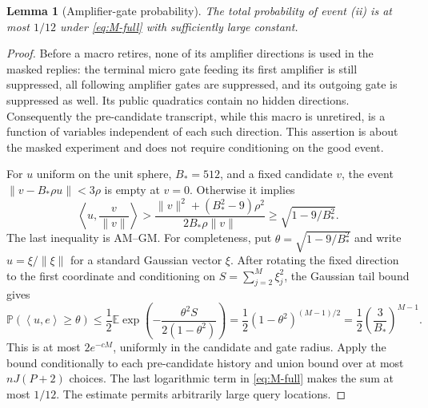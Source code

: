 \documentclass[11pt]{article}
\newtheorem{lemma}[theorem]{Lemma}
\theoremstyle{definition}
\theoremstyle{remark}
\newcommand{\E}{\mathbb E}
\newcommand{\PP}{\mathbb P}
\newcommand{\norm}[1]{\left\|#1\right\|}
\newcommand{\ip}[2]{\left\langle#1,#2\right\rangle}
\begin{document}
\begin{lemma}[Amplifier-gate probability]\label{lem:ampprob}
The total probability of event (ii) is at most $1/12$ under \eqref{eq:M-full} with sufficiently large constant.
\end{lemma}
\begin{proof}
Before a macro retires, none of its amplifier directions is used in the masked replies: the terminal micro gate feeding its first amplifier is still suppressed, all following amplifier gates are suppressed, and its outgoing gate is suppressed as well. Its public quadratics contain no hidden directions. Consequently the pre-candidate transcript, while this macro is unretired, is a function of variables independent of each such direction. This assertion is about the masked experiment and does not require conditioning on the good event.

For $u$ uniform on the unit sphere, $B_*=512$, and a fixed candidate $v$, the event $\|v-B_*\rho u\|<3\rho$ is empty at $v=0$. Otherwise it implies
\[
 \left\langle u,\frac{v}{\|v\|}\right\rangle
 >\frac{\|v\|^2+(B_*^2-9)\rho^2}{2B_*\rho\|v\|}
 \ge\sqrt{1-9/B_*^2}.
\]
The last inequality is AM--GM. For completeness, put $\theta=\sqrt{1-9/B_*^2}$ and write
$u=\xi/\norm{\xi}$ for a standard Gaussian vector $\xi$.
After rotating the fixed direction to the first coordinate and
conditioning on $S=\sum_{j=2}^M\xi_j^2$, the Gaussian tail bound gives
\[
 \PP(\ip u e\ge\theta)
 \le \frac12\E\exp\!\left(-\frac{\theta^2 S}{2(1-\theta^2)}\right)
 =\frac12(1-\theta^2)^{(M-1)/2}
 =\frac12\left(\frac3{B_*}\right)^{M-1}.
\]
This is at most $2e^{-cM}$, uniformly in the candidate and gate radius.
Apply the bound conditionally to each pre-candidate history and union
bound over at most $nJ(P+2)$ choices. The last logarithmic term in
\eqref{eq:M-full} makes the sum at most $1/12$. The estimate permits
arbitrarily large query locations.
\end{proof}
\end{document}
